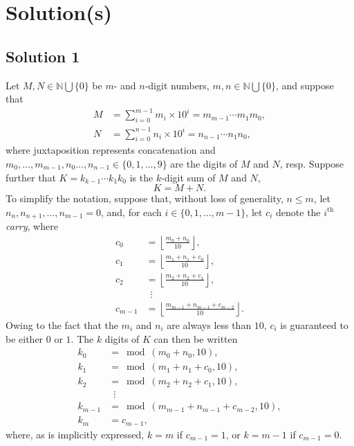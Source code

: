 
\section*{Solution(s)}

\subsection*{Solution 1}

Let $M, N \in \mathbb{N} \bigcup \{0\}$ be $m$- and $n$-digit numbers, $m, n \in \mathbb{N} \bigcup \{0\}$, and suppose that
\begin{align*}
    M &= \sum_{i=0}^{m-1} m_i \times 10^i = m_{m-1} \cdots m_1 m_0,\\
    N &= \sum_{i=0}^{n-1} n_i \times 10^i = n_{n-1} \cdots n_1 n_0,
\end{align*}
where juxtaposition represents concatenation and $m_0, \ldots, m_{m-1}, n_0 \ldots, n_{n-1} \in \{0, 1, \ldots, 9\}$ are the digits of $M$ and $N$, resp. Suppose further that $K = k_{k-1} \cdots k_1 k_0$ is the $k$-digit sum of $M$ and $N$,
$$
K = M + N.
$$
To simplify the notation, suppose that, without loss of generality, $n \le m$, let $n_n, n_{n+1}, \ldots, n_{m-1} = 0$, and, for each $i \in \{0, 1, \ldots, m-1\}$, let $c_i$ denote the $i^{\text{th}}$ \emph{carry}, where
\begin{align*}
    c_0 &= \left\lfloor\frac{m_0 + n_0}{10}\right\rfloor, \\
    c_1 &= \left\lfloor\frac{m_1 + n_1 + c_0}{10}\right\rfloor, \\
    c_2 &= \left\lfloor\frac{m_2 + n_2 + c_1}{10}\right\rfloor, \\
        &\,\,\,\vdots \\
    c_{m-1} &= \left\lfloor\frac{m_{m-1} + n_{m-1} + c_{m-2}}{10}\right\rfloor.
\end{align*}
Owing to the fact that the $m_i$ and $n_i$ are always less than $10$, $c_i$ is guaranteed to be either $0$ or $1$. The $k$ digits of $K$ can then be written
\begin{align*}
    k_0 &= \bmod(m_0 + n_0, 10), \\
    k_1 &= \bmod(m_1 + n_1 + c_0, 10), \\
    k_2 &= \bmod(m_2 + n_2 + c_1, 10), \\
        &\,\,\,\vdots \\
    k_{m-1} &= \bmod(m_{m-1} + n_{m-1} + c_{m-2}, 10), \\
    k_m &= c_{m-1},
\end{align*}
where, as is implicitly expressed, $k = m$ if $c_{m-1} = 1$, or $k = m-1$ if $c_{m-1} = 0$.

